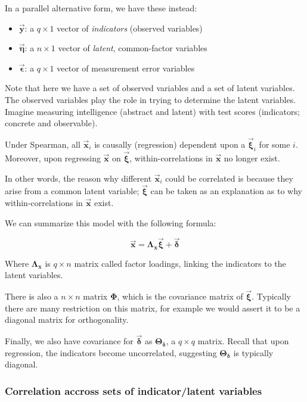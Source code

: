 \documentclass{article}
\begin{document}
\begin{multicols*}{2}
In a parallel alternative form, we have these instead:

\begin{itemize}
    \item $\mathbf{\vec{y}}$: a $q \times 1$ vector of \textit{indicators} (observed variables)
    \item $\mathbf{\vec{\eta}}$: a $n \times 1$ vector of \textit{latent}, common-factor variables
    \item $\mathbf{\vec{\epsilon}}$: a $q \times 1$ vector of measurement error variables
\end{itemize}

Note that here we have a set of observed variables and a set of latent variables. The observed variables play the role in trying to determine the latent variables. Imagine measuring intelligence (abstract and latent) with test scores (indicators; concrete and observable).

Under Spearman, all $\mathbf{\vec{x}}_i$ is causally (regression) dependent upon a $\mathbf{\vec{\xi}}_i$ for some $i$. Moreover, upon regressing $\mathbf{\vec{x}}$ on $\mathbf{\vec{\xi}}$, within-correlations in $\mathbf{\vec{x}}$ no longer exist.

In other words, the reason why different $\mathbf{\vec{x}}_i$ could be correlated is because they arise from a common latent variable; $\mathbf{\vec{\xi}}$ can be taken as an explanation as to why within-correlations in $\mathbf{\vec{x}}$ exist.

We can summarize this model with the following formula:

\[\mathbf{\vec{x}} = \mathbf{\Lambda_x}\mathbf{\vec{\xi}} + \mathbf{\vec{\delta}}\]

Where $\mathbf{\Lambda_x}$ is $q \times n$ matrix called factor loadings, linking the indicators to the latent variables.

There is also a $n \times n$ matrix $\mathbf{\Phi}$, which is the covariance matrix of $\mathbf{\vec{\xi}}$. Typically there are many restriction on this matrix, for example we would assert it to be a diagonal matrix for orthogonality.

Finally, we also have covariance for $\mathbf{\vec{\delta}}$ as $\mathbf{\Theta_\delta}$, a $q \times q$ matrix. Recall that upon regression, the indicators become uncorrelated, suggesting $\mathbf{\Theta_\delta}$ is typically diagonal.

\subsubsection{Correlation accross sets of indicator/latent variables}


\end{multicols*}
\end{document}
